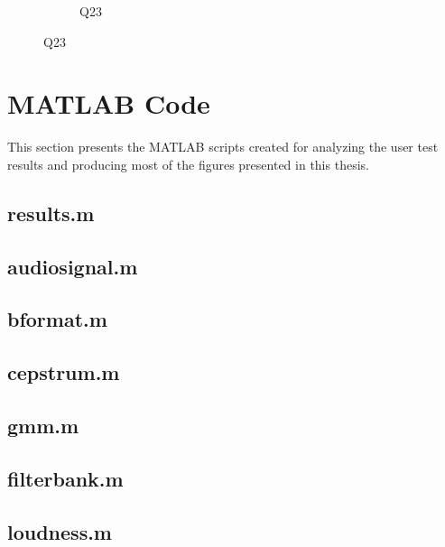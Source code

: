 \documentclass[english, 12pt, a4paper, pdftex, elec, utf8]{aaltothesis}
\begin{document}
\begin{figure}[h!]
\begin{subfigure}[b]{0.49\textwidth}
		\caption*{Q23}
	\end{subfigure}
\end{figure}

\clearpage

\section{MATLAB Code} \label{sec:matlab}

This section presents the MATLAB scripts created for analyzing the user test results and producing most of the figures presented in this thesis.

\lstset{
	language=matlab,
	basicstyle=\ttfamily\scriptsize, %
	inputencoding=utf8,
	extendedchars=true,
}

\subsection*{results.m}
\vspace{-4mm}

\vspace{8mm}
\subsection*{audiosignal.m}
\vspace{-4mm}

\vspace{8mm}
\subsection*{bformat.m}
\vspace{-4mm}

\vspace{8mm}
\subsection*{cepstrum.m}
\vspace{-4mm}

\vspace{8mm}
\subsection*{gmm.m}
\vspace{-4mm}

\vspace{8mm}
\subsection*{filterbank.m}
\vspace{-4mm}

\vspace{8mm}
\subsection*{loudness.m}
\vspace{-4mm}

\end{document}
